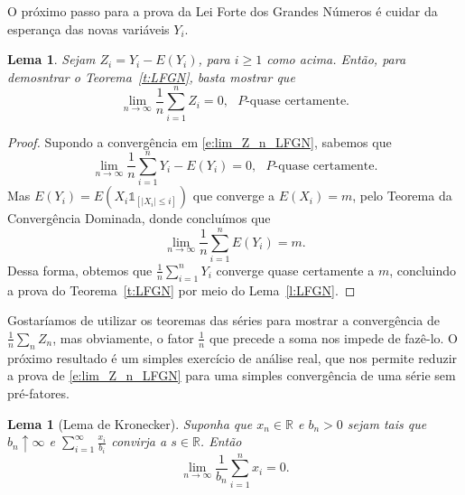 \documentclass[reqno]{article}
\newcommand*\1{\mathds{1}}
\newtheorem{lemma}[theorem]{Lema}
\begin{document}
O próximo passo para a prova da Lei Forte dos Grandes Números é cuidar da esperança das novas variáveis $Y_i$.
\begin{lemma}
  \label{l:lim_Z_n_LFGN}
  Sejam $Z_i = Y_i - E(Y_i)$, para $i \geq 1$ como acima.
  Então, para demosntrar o Teorema~\ref{t:LFGN}, basta mostrar que
  \begin{equation}
    \label{e:lim_Z_n_LFGN}
    \lim_{n \to \infty}\frac{1}{n} \sum_{i=1}^n Z_i = 0, \text{ $P$-quase certamente.}
  \end{equation}
\end{lemma}

\begin{proof}
  Supondo a convergência em \eqref{e:lim_Z_n_LFGN}, sabemos que
  \begin{equation}
    \lim_{n \to \infty} \frac{1}{n} \sum_{i=1}^n Y_i - E(Y_i) = 0, \text{ $P$-quase certamente.}
  \end{equation}
  Mas $E(Y_i) = E(X_i \1_{[|X_i| \leq i]})$ que converge a $E(X_i) = m$, pelo Teorema da Convergência Dominada, donde concluímos que
  \begin{equation}
    \lim_{n \to \infty} \frac{1}{n} \sum_{i=1}^n E(Y_i) = m.
  \end{equation}
  Dessa forma, obtemos que $\tfrac 1n \sum_{i=1}^n Y_i$ converge quase certamente a $m$, concluindo a prova do Teorema~\ref{t:LFGN} por meio do Lema~\ref{l:LFGN}.
\end{proof}

Gostaríamos de utilizar os teoremas das séries para mostrar a convergência de $\tfrac 1n \sum_{n} Z_n$, mas obviamente, o fator $\tfrac 1n$ que precede a soma nos impede de fazê-lo.
O próximo resultado é um simples exercício de análise real, que nos permite reduzir a prova de \eqref{e:lim_Z_n_LFGN} para uma simples convergência de uma série sem pré-fatores.

\begin{lemma}[Lema de Kronecker]
  Suponha que $x_n \in \mathbb{R}$ e $b_n > 0$ sejam tais que $b_n \uparrow \infty$ e $\sum_{i=1}^\infty \frac{x_i}{b_i}$ convirja a $s \in \mathbb{R}$.
  Então
  \begin{equation}
    \lim_{n \to \infty} \frac{1}{b_n} \sum_{i=1}^n x_i = 0.
  \end{equation}
\end{lemma}
\end{document}
